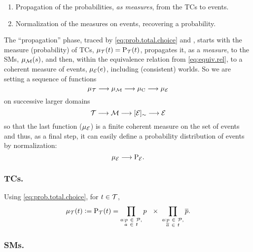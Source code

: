 \documentclass{tlp}
\newcommand{\at}[1]{\ensuremath{\!\del{#1}}}        %
\newcommand{\cla}[1]{\ensuremath{{\cal #1}}}        %
\newcommand{\co}[1]{\ensuremath{\overline{#1}}}     %
\newcommand{\PROBFset}{\ensuremath{\cla{P}}}
\newcommand{\TCHOICEset}{\ensuremath{\cla{T}}}
\newcommand{\MODELset}{\ensuremath{\cla{M}}}
\newcommand{\EVENTSset}{\ensuremath{\cla{E}}}
\newcommand{\prfunc}{\ensuremath{\mathrm{P}}}
\newcommand{\prd}[1]{\ensuremath{\prfunc_{#1}}}
\newcommand{\prT}{\prd{\TCHOICEset}}
\newcommand{\prE}{\prd{\EVENTSset}}
\newcommand{\pwT}{\ensuremath{\mu_{\TCHOICEset}}}
\newcommand{\pwt}[1]{\ensuremath{\pwT\at{#1}}}
\newcommand{\pwM}{\ensuremath{\mu_{\MODELset}}}
\newcommand{\pwm}[1]{\ensuremath{\pwM\at{#1}}}
\newcommand{\pwC}{\ensuremath{\mu_{\textrm{C}}}}
\newcommand{\pwE}{\ensuremath{\mu_{\EVENTSset}}}
\newcommand{\pwe}[1]{\ensuremath{\pwE\at{#1}}}
\newcommand{\probfact}[2]{\ensuremath{#1:#2}}
\newcommand{\class}[1]{\ensuremath{[{#1}]_{\sim}}}
\begin{document}
\begin{enumerate}
\item Propagation of the probabilities, \emph{as measures}, from the
  \aclp{TC} to events.
\item Normalization of the measures on events, recovering a
  probability.
\end{enumerate}

The ``propagation'' phase, traced by \cref{eq:prob.total.choice} and
, starts with the
measure (probability) of \aclp{TC}, \(\pwt{t} = \prT\at{t}\),
propagates it, as a \emph{measure}, to the \aclp{SM}, \(\pwm{s}\), and
then, within the equivalence relation from \cref{eq:equiv.rel}, to a
coherent measure of events, \(\pwe{e}\), including (consistent)
worlds.  So we are setting a sequence of functions
\begin{equation*}
    \pwT \longrightarrow \pwM \longrightarrow \pwC \longrightarrow \pwE
\end{equation*}
on successive larger domains
\begin{equation*}
    \TCHOICEset \longrightarrow \MODELset \longrightarrow \class{\EVENTSset} \longrightarrow \EVENTSset
\end{equation*}
so that the last function (\(\pwE\)) is a finite coherent measure on
the set of events and thus, as a final step, it can easily define a
probability distribution of events by normalization:
\begin{equation*}
    \pwE \longrightarrow \prE.
\end{equation*}


\subsubsection*{\Aclp{TC}.}

Using \cref{eq:prob.total.choice}, for \(t \in \TCHOICEset\),
\begin{equation}
    \pwt{t} := \prT\at{t}=
    \prod_{\substack{
            \probfact{a}{p}~ \in ~\PROBFset,\\
            a~ \in~ t}} p\ \ \times\
    \prod_{\substack{
            \probfact{a}{p}~ \in ~\PROBFset,\\
            \co{a}~\in~ t}} \co{p}.
    \label{eq:measure.tchoice}
\end{equation}


\subsubsection*{\Aclp{SM}.}
\end{document}
